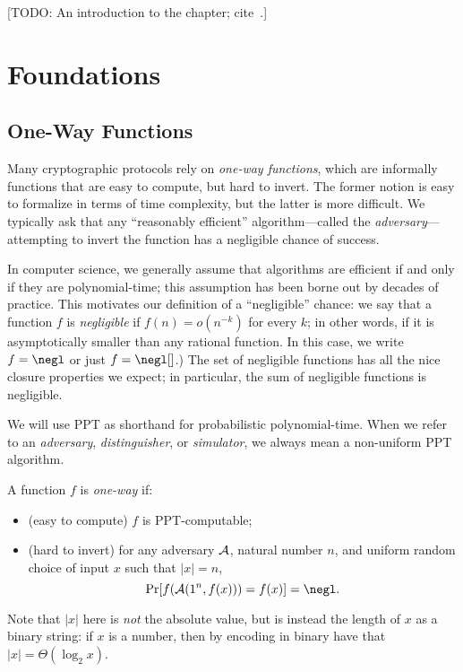 [TODO: An introduction to the chapter;
cite~\cite{katz-lindell-2014, pass-shelat-2020, rosulek-2021}.]

\section{Foundations}

\subsection{One-Way Functions}

Many cryptographic protocols rely on \emph{one-way functions}, which are
informally functions that are easy to compute, but hard to invert. The former
notion is easy to formalize in terms of time complexity, but the latter is more
difficult. We typically ask that any ``reasonably efficient'' algorithm---called
the \emph{adversary}---attempting to invert the function has a negligible chance
of success.

In computer science, we generally assume that algorithms are efficient if and
only if they are polynomial-time; this assumption has been borne out by decades
of practice. This motivates our definition of a ``negligible'' chance: we say
that a function $f$ is \emph{negligible} if $f(n) = o(n^{-k})$
for every $k$; in other words, if it is asymptotically smaller than any rational
function. In this case, we write $f = \negl$ or just $f = \negl[]$.) The set
of negligible functions has all the nice closure properties we expect; in
particular, the sum of negligible functions is negligible.


\begin{ntn}
  We will use PPT as shorthand for probabilistic polynomial-time. When we refer
  to an \emph{adversary}, \emph{distinguisher}, or \emph{simulator}, we always
  mean a non-uniform PPT algorithm.
\end{ntn}

\begin{dfn}\label{def:one-way function}
  A function $f$ is \emph{one-way} if:
  \begin{itemize}
    \item (easy to compute) $f$ is PPT-computable;
    \item (hard to invert) for any adversary $\mathcal{A}$, natural number $n$, and
      uniform random choice of input $x$ such that $|x| = n$, \[
        \Pr[f(\cA(1^n, f(x))) = f(x)] = \negl.
      \]
  \end{itemize}
  Note that $|x|$ here is \emph{not} the absolute value, but is instead the
  length of $x$ as a binary string: if $x$ is a number, then by encoding in
  binary have that $|x| = \Theta(\log_2 x)$.
\end{dfn}

